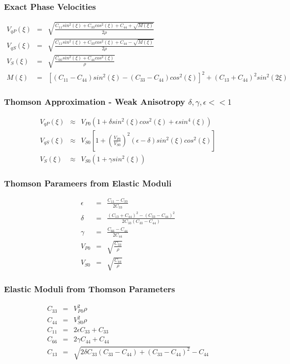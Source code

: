 \documentclass{beamer}
\begin{document}
\begin{frame}
\frametitle{Exact Phase Velocities}
\fontsize{6pt}{7.2}\selectfont

\begin{eqnarray}
V_{qP}(\xi) &=& \sqrt{\frac{C_{11}sin^2(\xi)+C_{33}cos^2(\xi)+C_{44}+\sqrt{M(\xi)}}{2\rho}} \nonumber \\
V_{qS}(\xi) &=& \sqrt{\frac{C_{11}sin^2(\xi)+C_{33}cos^2(\xi)+C_{44}-\sqrt{M(\xi)}}{2\rho}} \nonumber \\
V_{S}(\xi) &=& \sqrt{\frac{C_{66}sin^2(\xi)+C_{44}cos^2(\xi)}{\rho}} \nonumber \\
M(\xi) &=& \left[(C_{11}-C_{44})sin^2(\xi)-(C_{33}-C_{44})cos^2(\xi)\right]^2 + (C_{13}+C_{44})^2sin^2(2\xi) \nonumber
\end{eqnarray}

\end{frame}

\begin{frame}
\frametitle{Thomson Approximation - Weak Anisotropy $\delta,\gamma,\epsilon << 1$}
\fontsize{6pt}{7.2}\selectfont

\begin{eqnarray}
V_{qP}(\xi) &\approx& V_{P0} (1 + \delta sin^2(\xi)cos^2(\xi) + \epsilon sin^4(\xi))\nonumber \\
V_{qS}(\xi) &\approx& V_{S0} \left[ 1 + \left(\frac{V_{P0}}{V_{S0}}\right)^2 (\epsilon-\delta)sin^2(\xi)cos^2(\xi) \right]\nonumber \\
V_{S}(\xi)  &\approx& V_{S0} (1 + \gamma sin^2(\xi))\nonumber
\end{eqnarray}

\end{frame}

\begin{frame}
\frametitle{Thomson Parameers from Elastic Moduli}
\begin{eqnarray}
\epsilon &=& \frac{C_{11}-C_{33}}{2C_{33}} \nonumber \\
\delta &=& \frac{(C_{13}+C_{44})^2-(C_{33}-C_{44})^2}{2C_{33}(C_{33}-C_{44})} \nonumber \\
\gamma &=& \frac{C_{66}-C_{44}}{2C_{44}} \nonumber \\
V_{P0} &=& \sqrt{\frac{C_{33}}{\rho}} \nonumber \\
V_{S0} &=& \sqrt{\frac{C_{44}}{\rho}} \nonumber 
\end{eqnarray}
\end{frame}

\begin{frame}
\frametitle{Elastic Moduli from Thomson Parameters}
\begin{eqnarray}
C_{33} &=& V_{P0}^2 \rho \nonumber \\
C_{44} &=& V_{S0}^2 \rho \nonumber \\
C_{11} &=& 2 \epsilon C_{33} + C_{33} \nonumber \\
C_{66} &=& 2 \gamma C_{44} + C_{44} \nonumber \\
C_{13} &=& \sqrt{2 \delta C_{33} (C_{33} - C_{44}) + (C_{33} - C_{44})^2} - C_{44} \nonumber 
\end{eqnarray}
\end{frame}
\end{document}
